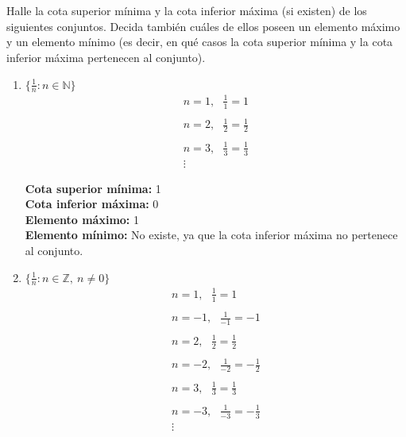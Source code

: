 \documentclass[12pt]{article}
\begin{document}
\section{}
Halle la cota superior mínima y la cota inferior máxima (si existen) de los siguientes conjuntos. Decida también
cuáles de ellos poseen un elemento máximo y un elemento mínimo (es decir, en qué casos la cota superior mínima y
la cota inferior máxima pertenecen al conjunto).

\begin{enumerate}[label=\textit{\roman*})]
    
    \item $\{\frac{1}{n} : n \in \mathbb{N}\}$ \\
        \begin{align*}
            n= 1,\, \, \, \, \frac{1}{1} = 1 \\ \\
            n= 2,\, \, \, \, \frac{1}{2} = \frac{1}{2} \\ \\
            n= 3,\, \, \, \, \frac{1}{3} = \frac{1}{3} \\
            \vdots
        \end{align*}
    
    \textbf{Cota superior mínima:} 1  \\
    \textbf{Cota inferior máxima:} 0 \\
    \textbf{Elemento máximo:} 1 \\
    \textbf{Elemento mínimo:} No existe, ya que la cota inferior máxima
    no pertenece al conjunto.  \\

        \newpage

    \item $\{\frac{1}{n} : n \in \mathbb{Z},\ n \neq 0\}$ \\
        \begin{align*}
            n= 1,\, \, \, \, \frac{1}{1} = 1 \\ \\
            n= -1,\, \, \, \, \frac{1}{-1} = -1 \\ \\
            n= 2,\, \, \, \, \frac{1}{2} = \frac{1}{2} \\ \\
            n= -2,\, \, \, \, \frac{1}{-2} = -\frac{1}{2} \\ \\
            n= 3,\, \, \, \, \frac{1}{3} = \frac{1}{3} \\ \\
            n= -3,\, \, \, \, \frac{1}{-3} = -\frac{1}{3} \\ 
            \vdots
        \end{align*}


\end{enumerate}
\end{document}
